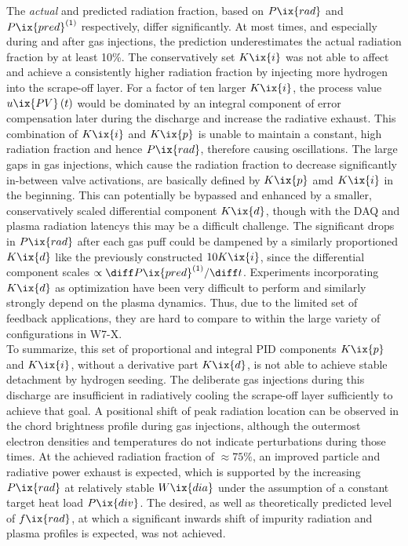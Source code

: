             The \textit{actual} and predicted radiation fraction, based on $P\ix{rad}$ and $P\ix{pred}^{\left(1\right)}$ respectively, differ significantly. At most times, and especially during and after gas injections, the prediction underestimates the actual radiation fraction by at least 10\%. The conservatively set $K\ix{i}$ was not able to affect and achieve a consistently higher radiation fraction by injecting more hydrogen into the scrape-off layer. For a factor of ten larger $K\ix{i}$, the process value $u\ix{PV}\left(t\right)$ would be dominated by an integral component of error compensation later during the discharge and increase the radiative exhaust. This combination of $K\ix{i}$ and $K\ix{p}$ is unable to maintain a constant, high radiation fraction and hence $P\ix{rad}$, therefore causing oscillations. The large gaps in gas injections, which cause the radiation fraction to decrease significantly in-between valve activations, are basically defined by $K\ix{p}$ amd $K\ix{i}$ in the beginning. This can potentially be bypassed and enhanced by a smaller, conservatively scaled differential component $K\ix{d}$, though with the DAQ and plasma radiation latencys this may be a difficult challenge. The significant drops in $P\ix{rad}$ after each gas puff could be dampened by a similarly proportioned $K\ix{d}$ like the previously constructed $10K\ix{i}$, since the differential component scales $\propto\diff P\ix{pred}^{\left(1\right)}/\diff t$. Experiments incorporating $K\ix{d}$ as optimization have been very difficult to perform and similarly strongly depend on the plasma dynamics. Thus, due to the limited set of feedback applications, they are hard to compare to within the large variety of configurations in W7-X.\\%
            To summarize, this set of proportional and integral PID components $K\ix{p}$ and $K\ix{i}$, without a derivative part $K\ix{d}$, is not able to achieve stable detachment by hydrogen seeding. The deliberate gas injections during this discharge are insufficient in radiatively cooling the scrape-off layer sufficiently to achieve that goal. A positional shift of peak radiation location can be observed in the chord brightness profile during gas injections, although the outermost electron densities and temperatures do not indicate perturbations during those times. At the achieved radiation fraction of $\approx75\%$, an improved particle and radiative power exhaust is expected, which is supported by the increasing $P\ix{rad}$ at relatively stable $W\ix{dia}$ under the assumption of a constant target heat load $P\ix{div}$. The desired, as well as theoretically predicted level of $f\ix{rad}$\cite{Feng2016}, at which a significant inwards shift of impurity radiation and plasma profiles is expected, was not achieved.\\%
